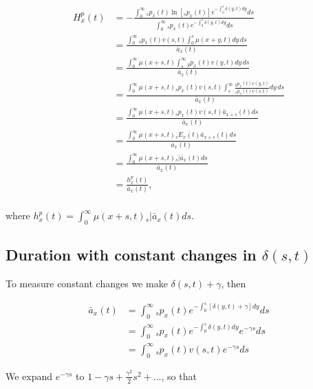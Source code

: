 \documentclass[12pt]{article}
\begin{document}
\begin{equation} \label{eq:EntropyAnnuityA1}
\begin{split}
{H}^{p}_{x}(t) &= -\frac{ \int_{0}^{\infty}{}_sp_x(t)\ln[{}_sp_x(t)] e^{-\int_{0}^{s}\delta(y,t)dy} ds}{\int_0^\infty {}_sp_x(t) e^{-\int_{0}^{s}\delta(y,t)dy} ds}\\
&= \frac{\int_0^\infty {}_sp_x(t) {v}(s,t) \int_0^s \mu(x+y,t) dy\,ds}{\bar{a}_x(t)}\\
&= \frac{\int_0^\infty  \mu(x+s,t) \int_s^\infty {}_yp_x(t) {v}(y,t)  dy\,ds}{\bar{a}_x(t)}\\
&= \frac{\int_0^\infty  \mu(x+s,t)  {}_sp_x(t) {v}(s,t) \int_s^\infty \frac{ {}_yp_x(t) {v}(y,t)}{ {}_sp_x(t) {v}(s,t)}  dy\,ds}{\bar{a}_x(t)}\\
&=  \frac{\int_0^\infty \mu(x+s,t)   {}_sp_x(t) {v}(s,t) \bar{a}_{x+s}(t) ds}{\bar{a}_x(t)} \\
&=  \frac{\int_0^\infty \mu(x+s,t)   {}_sE_x(t) \bar{a}_{x+s}(t) ds}{\bar{a}_x(t)} \\
&=  \frac{\int_0^\infty \mu(x+s,t)   {}_s|\bar{a}_x(t) ds}{\bar{a}_x(t)} \\
&=  \frac{{h}^{p}_{x}(t)}{\bar{a}_x(t)}, \\
\end{split}
\end{equation}

where ${h}^{p}_{x}(t)=\int_0^\infty \mu(x+s,t)   {}_s|\bar{a}_x(t) ds$.



\subsection{Duration with constant changes in $\delta(s,t)$}

To measure constant changes we make $\delta(s,t)+\gamma$, then

\begin{equation}\label{eq:DurationConst1}
\begin{split}
\bar{a}_{x}(t) &= \int_0^\infty {}_sp_x(t) e^{- \int_{0}^{s} [\delta(y,t)+\gamma]dy}ds \\
&= \int_0^\infty {}_sp_x(t) e^{- \int_{0}^{s}\delta(y,t)dy}e^{-\gamma s}ds \\
&= \int_0^\infty {}_sp_x(t) {v}(s,t)e^{-\gamma s}ds
\end{split}
\end{equation}

We expand $e^{-\gamma s}$ to $1-\gamma s+\frac{\gamma^2}{2} s^{2} +...$, so that
\end{document}
